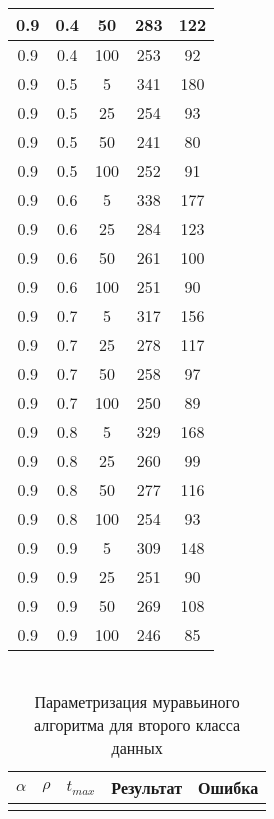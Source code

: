 \begin{appendices}
\begin{center}
\begin{longtable}[c]{|c|c|c|c|c|}
		0.9& 0.4& 50& 283&  122\\
		\hline
		0.9& 0.4& 100& 253&  92\\
		\hline
		0.9& 0.5& 5& 341&  180\\
		\hline
		0.9& 0.5& 25& 254&  93\\
		\hline
		0.9& 0.5& 50& 241&  80\\
		\hline
		0.9& 0.5& 100& 252&  91\\
		\hline
		0.9& 0.6& 5& 338&  177\\
		\hline
		0.9& 0.6& 25& 284&  123\\
		\hline
		0.9& 0.6& 50& 261&  100\\
		\hline
		0.9& 0.6& 100& 251&  90\\
		\hline
		0.9& 0.7& 5& 317&  156\\
		\hline
		0.9& 0.7& 25& 278&  117\\
		\hline
		0.9& 0.7& 50& 258&  97\\
		\hline
		0.9& 0.7& 100& 250&  89\\
		\hline
		0.9& 0.8& 5& 329&  168\\
		\hline
		0.9& 0.8& 25& 260&  99\\
		\hline
		0.9& 0.8& 50& 277&  116\\
		\hline
		0.9& 0.8& 100& 254&  93\\
		\hline
		0.9& 0.9& 5& 309&  148\\
		\hline
		0.9& 0.9& 25& 251&  90\\
		\hline
		0.9& 0.9& 50& 269&  108\\
		\hline
		0.9& 0.9& 100& 246&  85\\
		\hline
		
	\end{longtable}
\end{center}

\chapter{}
\label{tabel_mt2}
\begin{longtable}[c]{|c|c|c|c|c|}
	
	\caption[c]{Параметризация муравьиного алгоритма для второго класса данных} \\
	\hline
	$\alpha$ & $ \rho $ & $t_{max}$ & Результат & Ошибка \\
	\hline
	\endhead
	
	\hline
	\endfoot
	\hline
	

\end{longtable}
\end{appendices}
